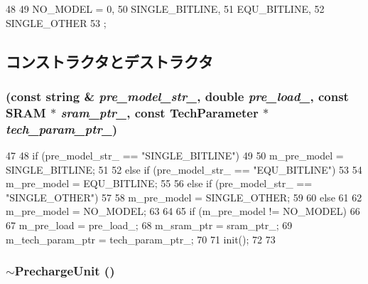 \begin{DoxyCode}
48     {
49       NO_MODEL = 0,
50       SINGLE_BITLINE,
51       EQU_BITLINE,
52       SINGLE_OTHER
53     };
\end{DoxyCode}


\subsection{コンストラクタとデストラクタ}
\hypertarget{classPrechargeUnit_aceac0549b000908f120a643ad18fed72}{
\subsubsection[{PrechargeUnit}]{ (const string \& {\em pre\_\-model\_\-str\_\-}, \/  double {\em pre\_\-load\_\-}, \/  const {\bf SRAM} $\ast$ {\em sram\_\-ptr\_\-}, \/  const {\bf TechParameter} $\ast$ {\em tech\_\-param\_\-ptr\_\-})}}
\label{classPrechargeUnit_aceac0549b000908f120a643ad18fed72}



\begin{DoxyCode}
47 {
48     if (pre_model_str_ == "SINGLE_BITLINE")
49     {
50         m_pre_model = SINGLE_BITLINE;
51     }
52     else if (pre_model_str_ == "EQU_BITLINE")
53     {
54         m_pre_model = EQU_BITLINE;
55     }
56     else if (pre_model_str_ == "SINGLE_OTHER")
57     {
58         m_pre_model = SINGLE_OTHER;
59     }
60     else
61     {
62         m_pre_model = NO_MODEL;
63     }
64 
65     if (m_pre_model != NO_MODEL)
66     {
67         m_pre_load = pre_load_;
68         m_sram_ptr = sram_ptr_;
69         m_tech_param_ptr = tech_param_ptr_;
70 
71         init();
72     }
73 }
\end{DoxyCode}
\hypertarget{classPrechargeUnit_a59c1c2c5b77e6304677d6f5750a31556}{
\subsubsection[{$\sim$PrechargeUnit}]{\setlength{\rightskip}{0pt plus 5cm}$\sim${\bf PrechargeUnit} ()}}
\label{classPrechargeUnit_a59c1c2c5b77e6304677d6f5750a31556}



